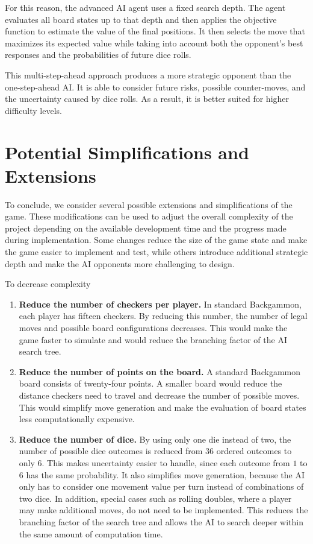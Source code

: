 \documentclass[11pt]{article}
\begin{document}
For this reason, the advanced AI agent uses a fixed search depth. The agent evaluates all board states up to that depth and then applies the objective function to estimate the value of the final positions. It then selects the move that maximizes its expected value while taking into account both the opponent's best responses and the probabilities of future dice rolls.

This multi-step-ahead approach produces a more strategic opponent than the one-step-ahead AI. It is able to consider future risks, possible counter-moves, and the uncertainty caused by dice rolls. As a result, it is better suited for higher difficulty levels.

\section{Potential Simplifications and Extensions}
To conclude, we consider several possible extensions and simplifications of the game. These modifications can be used to adjust the overall complexity of the project depending on the available development time and the progress made during implementation. Some changes reduce the size of the game state and make the game easier to implement and test, while others introduce additional strategic depth and make the AI opponents more challenging to design.

To decrease complexity
\begin{enumerate}
    \item \textbf{Reduce the number of checkers per player.}  
    In standard Backgammon, each player has fifteen checkers. By reducing this number, the number of legal moves and possible board configurations decreases. This would make the game faster to simulate and would reduce the branching factor of the AI search tree.

    \item \textbf{Reduce the number of points on the board.}  
    A standard Backgammon board consists of twenty-four points. A smaller board would reduce the distance checkers need to travel and decrease the number of possible moves. This would simplify move generation and make the evaluation of board states less computationally expensive.

    \item \textbf{Reduce the number of dice.}  
    By using only one die instead of two, the number of possible dice outcomes is reduced from \(36\) ordered outcomes to only \(6\). This makes uncertainty easier to handle, since each outcome from \(1\) to \(6\) has the same probability. It also simplifies move generation, because the AI only has to consider one movement value per turn instead of combinations of two dice. In addition, special cases such as rolling doubles, where a player may make additional moves, do not need to be implemented. This reduces the branching factor of the search tree and allows the AI to search deeper within the same amount of computation time.
\end{enumerate}
\end{document}
